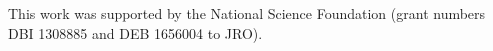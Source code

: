 This work was supported by the National Science Foundation (grant numbers DBI
1308885 and DEB 1656004 to JRO).

